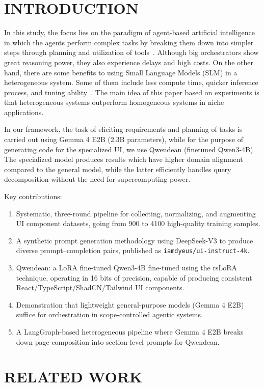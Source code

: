 \documentclass[conference]{IEEEtran}
\begin{document}
\section{INTRODUCTION}

In this study, the focus lies on the paradigm of agent-based artificial intelligence in which the agents perform complex tasks by breaking them down into simpler steps through planning and utilization of tools~\cite{ref1,ref2}. Although big orchestrators show great reasoning power, they also experience delays and high costs. On the other hand, there are some benefits to using Small Language Models (SLM) in a heterogeneous system. Some of them include less compute time, quicker inference process, and tuning ability~\cite{ref1}. The main idea of this paper based on experiments is that heterogeneous systems outperform homogeneous systems in niche applications.

In our framework, the task of eliciting requirements and planning of tasks is carried out using Gemma 4 E2B (2.3B parameters), while for the purpose of generating code for the specialized UI, we use Qwendean (finetuned Qwen3-4B). The specialized model produces results which have higher domain alignment compared to the general model, while the latter efficiently handles query decomposition without the need for supercomputing power.

Key contributions:
\begin{enumerate}
    \item Systematic, three-round pipeline for collecting, normalizing, and augmenting UI component datasets, going from 900 to 4100 high-quality training samples.
    \item A synthetic prompt generation methodology using DeepSeek-V3 to produce diverse prompt–completion pairs, published as \texttt{iamdyeus/ui-instruct-4k}.
    \item Qwendean: a LoRA fine-tuned Qwen3-4B fine-tuned using the rsLoRA technique, operating in 16 bits of precision, capable of producing consistent React/TypeScript/ShadCN/Tailwind UI components.
    \item Demonstration that lightweight general-purpose models (Gemma 4 E2B) suffice for orchestration in scope-controlled agentic systems.
    \item A LangGraph-based heterogeneous pipeline where Gemma 4 E2B breaks down page composition into section-level prompts for Qwendean.
\end{enumerate}


\section{RELATED WORK}
\end{document}
